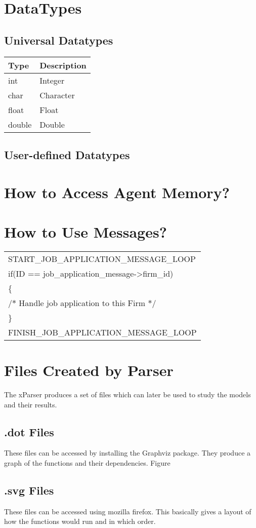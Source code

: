 \section{DataTypes}
\subsection{Universal Datatypes}
\begin{center}
\begin{tabular}{|l|l|}
\hline Type & Description\\
\hline int & Integer\\
char & Character \\
float & Float \\
double & Double \\
\hline
\end{tabular}
\end{center}
\subsection{User-defined Datatypes}
\section{How to Access Agent Memory?}
\section{How to Use Messages?}
\begin{center}
\begin{tabular}{|l|}
\hline
 START\_JOB\_APPLICATION\_MESSAGE\_LOOP\\
  if(ID == job\_application\_message->firm\_id)\\
  \{ \\
   /$\ast$ Handle job application to this Firm $\ast$/ \\
  \} \\
FINISH\_JOB\_APPLICATION\_MESSAGE\_LOOP \\
\hline
\end{tabular}\end{center}
\section{Files Created by Parser}
The xParser produces a set of files which can later be used to study
the models and their results.
\subsection{.dot Files}
These files can be accessed by installing the Graphviz package. They
produce a graph of the functions and their dependencies. Figure
\subsection{.svg Files}
These files can be accessed using mozilla firefox. This basically
gives a layout of how the functions would run and in which order.

